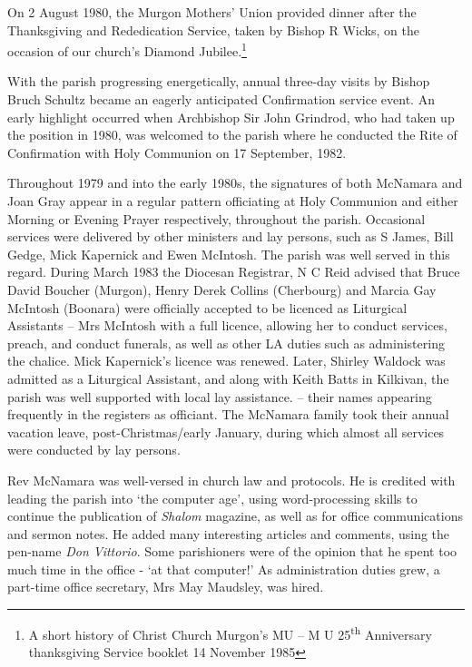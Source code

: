 On 2 August 1980, the Murgon Mothers' Union provided dinner after the Thanksgiving and Rededication Service, taken by Bishop R Wicks, on the occasion of our church's Diamond Jubilee.\footnote{A short history of Christ Church Murgon's MU -- M U 25\textsuperscript{th} Anniversary thanksgiving Service booklet 14 November 1985}


With the parish progressing energetically, annual three-day visits by Bishop Bruch Schultz became an eagerly anticipated Confirmation service event. An early highlight occurred when Archbishop Sir John Grindrod, who had taken up the position in 1980, was welcomed to the parish where he conducted the Rite of Confirmation with Holy Communion on 17 September, 1982.



Throughout 1979 and into the early 1980s, the signatures of both McNamara and Joan Gray appear in a regular pattern officiating at Holy Communion and either Morning or Evening Prayer respectively, throughout the parish. Occasional services were delivered by other ministers and lay persons, such as S James, Bill Gedge, Mick Kapernick and Ewen McIntosh. The parish was well served in this regard. During March 1983 the Diocesan Registrar, N C Reid advised that Bruce David Boucher (Murgon), Henry Derek Collins (Cherbourg) and Marcia Gay McIntosh (Boonara) were officially accepted to be licenced as Liturgical Assistants -- Mrs McIntosh with a full licence, allowing her to conduct services, preach, and conduct funerals, as well as other LA duties such as administering the chalice. Mick Kapernick's licence was renewed. Later, Shirley Waldock was admitted as a Liturgical Assistant, and along with Keith Batts in Kilkivan, the parish was well supported with local lay assistance. -- their names appearing frequently in the registers as officiant. The McNamara family took their annual vacation leave, post-Christmas/early January, during which almost all services were conducted by lay persons.



Rev McNamara was well-versed in church law and protocols. He is credited with leading the parish into `the computer age', using word-processing skills to continue the publication of \emph{Shalom} magazine, as well as for office communications and sermon notes. He added many interesting articles and comments, using the pen-name \emph{Don Vittorio}. Some parishioners were of the opinion that he spent too much time in the office - `at that computer!' As administration duties grew, a part-time office secretary, Mrs May Maudsley, was hired.




